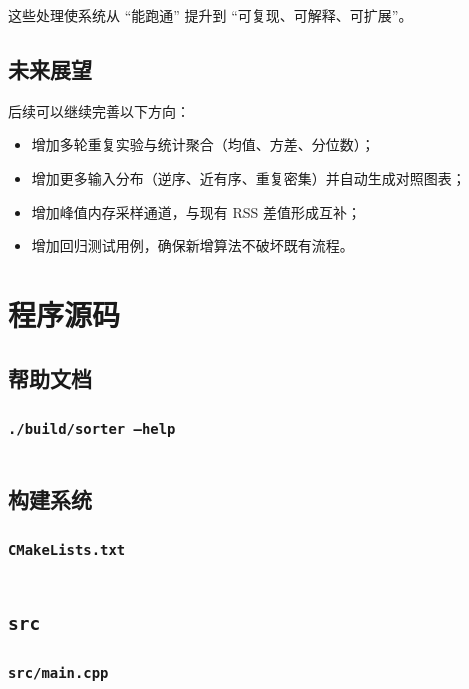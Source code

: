 \documentclass[12pt, a4paper]{ctexart}
\begin{document}
这些处理使系统从 ``能跑通'' 提升到 ``可复现、可解释、可扩展''。

\subsection{未来展望}

后续可以继续完善以下方向：

\begin{itemize}
    \item 增加多轮重复实验与统计聚合（均值、方差、分位数）；
    \item 增加更多输入分布（逆序、近有序、重复密集）并自动生成对照图表；
    \item 增加峰值内存采样通道，与现有 RSS 差值形成互补；
    \item 增加回归测试用例，确保新增算法不破坏既有流程。
\end{itemize}

\appendix

\section{程序源码}

\subsection{帮助文档}

\subsubsection{\texttt{./build/sorter --help}}
\inputminted{text}{../res/help.txt}

\subsection{构建系统}

\subsubsection{\texttt{CMakeLists.txt}}
\inputminted{cmake}{../CMakeLists.txt}

\subsection{\texttt{src}}

\subsubsection{\texttt{src/main.cpp}}
\inputminted{cpp}{../src/main.cpp}
\end{document}

